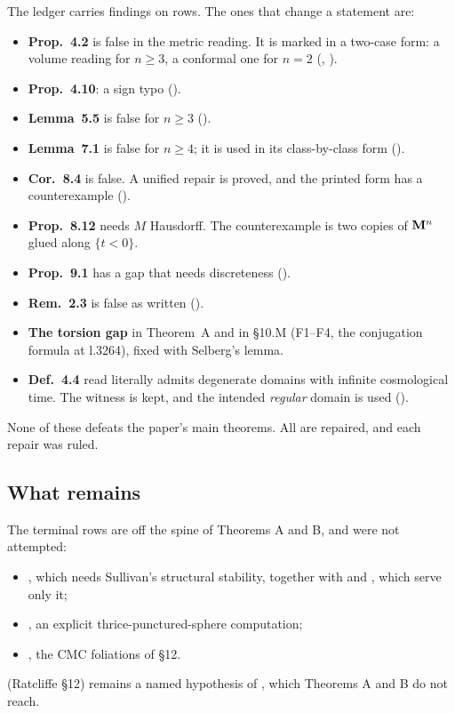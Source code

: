 The ledger carries \numBarbotFindings{} findings on \numBarbotFindingrows{} rows. The ones that
change a statement are:
\begin{itemize}
\item \textbf{Prop.~4.2} is false in the metric reading. It is marked in a two-case form: a volume
  reading for $n\ge3$, a conformal one for $n=2$ (, ).
\item \textbf{Prop.~4.10}: a sign typo ().
\item \textbf{Lemma~5.5} is false for $n\ge3$ ().
\item \textbf{Lemma~7.1} is false for $n\ge4$; it is used in its class-by-class form ().
\item \textbf{Cor.~8.4} is false. A unified repair is proved, and the printed form has a
  counterexample ().
\item \textbf{Prop.~8.12} needs $M$ Hausdorff. The counterexample is two copies of $\mathbf{M}^n$
  glued along $\{t<0\}$.
\item \textbf{Prop.~9.1} has a gap that needs discreteness ().
\item \textbf{Rem.~2.3} is false as written ().
\item \textbf{The torsion gap} in Theorem~A and in §10.M (F1--F4, the conjugation formula at
  l.3264), fixed with Selberg's lemma.
\item \textbf{Def.~4.4} read literally admits degenerate domains with infinite cosmological time.
  The witness  is kept, and the intended \emph{regular} domain
  is used ().
\end{itemize}
None of these defeats the paper's main theorems. All are repaired, and each repair was ruled.

\subsection{What remains}

The \numBarbotTerminal{} terminal rows are off the spine of Theorems A and B, and were not
attempted:
\begin{itemize}
\item {}, which needs Sullivan's structural stability, together with
   and , which serve only it;
\item {}, an explicit thrice-punctured-sphere computation;
\item {}, the CMC foliations of §12.
\end{itemize}
 (Ratcliffe §12) remains a named hypothesis of , which
Theorems A and B do not reach.

